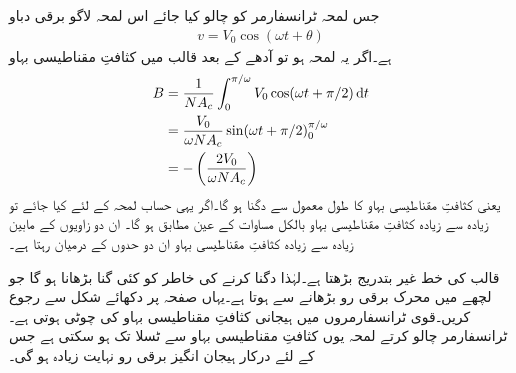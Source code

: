جس لمحہ ٹرانسفارمر کو چالو کیا جائے اس لمحہ لاگو برقی دباو
\begin{align*}
v=V_0 \cos (\omega t+\theta)
\end{align*}
ہے۔اگر  یہ لمحہ ہو تو آدھے   کے بعد قالب میں کثافتِ مقناطیسی بہاو
\begin{align*}
B&=\frac{1}{N A_c} \int_{0}^{\pi/\omega} V_0 \cos (\omega t+\pi/2) \dif t\\
&=\frac{V_0}{\omega N A_c} \sin (\omega t+\pi/2)_0^{\pi/\omega}\\
&=-\left(\frac{2 V_0}{\omega N A_c} \right)
\end{align*}
یعنی کثافتِ مقناطیسی بہاو کا طول معمول سے دگنا ہو گا۔اگر یہی حساب  لمحہ کے لئے کیا جائے تو زیادہ سے زیادہ کثافتِ مقناطیسی بہاو بالکل مساوات   کے عین مطابق ہو گا۔ ان دو زاویوں کے مابین زیادہ سے زیادہ کثافتِ مقناطیسی بہاو ان دو حدوں کے درمیان رہتا ہے۔ 

قالب کی   خط غیر بتدریج بڑھتا ہے۔لہٰذا   دگنا کرنے کی خاطر  کو کئی گنا بڑھانا ہو گا جو لچھے میں محرک برقی رو بڑھانے سے ہوتا ہے۔یہاں صفحہ  پر دکھائے  شکل   سے رجوع کریں۔قوی ٹرانسفارمروں میں ہیجانی کثافتِ مقناطیسی بہاو کی چوٹی  ہوتی ہے۔ٹرانسفارمر چالو کرتے لمحہ یوں کثافتِ مقناطیسی بہاو   سے   ٹسلا تک ہو سکتی ہے جس کے لئے درکار ہیجان انگیز برقی رو نہایت زیادہ ہو گی۔

